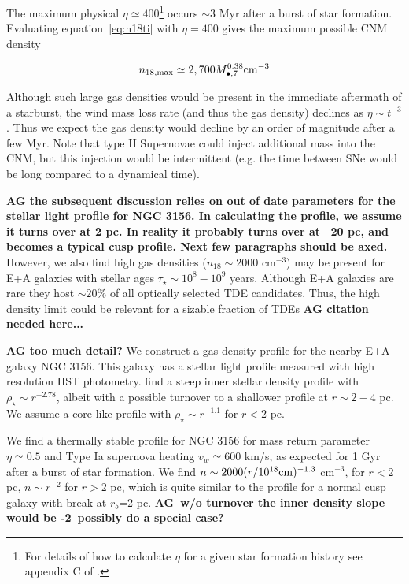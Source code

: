 \documentclass[usenatbib,fleqn]{mnras}
\newcommand{\Mbh}[1][]{M_{\bullet#1}}
\begin{document}
The maximum physical $\eta\simeq 400$\footnote{For details
  of how to calculate $\eta$ for a given star formation history see
  appendix C of \citet{Generozov+2015}.} occurs $\sim 3$ Myr after a
burst of star formation. Evaluating equation~\eqref{eq:n18ti} with
$\eta=400$ gives the maximum possible CNM density

\begin{equation}
n_{\rm 18,max} \simeq 2,700 \Mbh[,7]^{0.38} {\rm cm^{-3}}
\label{eq:n18max}
\end{equation}

Although such large gas densities would be present in the immediate
aftermath of a starburst, the wind mass loss rate (and thus the gas
density) declines as $\eta \sim t^{-3}$. Thus we expect the gas density would
decline by an order of magnitude after a few Myr. Note that type II
Supernovae could inject additional mass into the CNM, but this
injection would be intermittent (e.g. the time between SNe would be
long compared to a dynamical time).

{\bf AG the subsequent discussion relies on out of date parameters for
the stellar light profile for NGC 3156. In calculating the profile, we
assume it turns over at 2 pc. In reality it probably turns over at ~20
pc, and becomes a typical cusp profile. Next few paragraphs should be axed.}
However, we also find high gas densities ($n_{18}\sim 2000$ cm$^{-3}$)
may be present for E+A galaxies with stellar ages $\tau_\star\sim
10^8-10^9$ years. Although E+A galaxies are rare they host $\sim 20
\%$ of all optically selected TDE candidates. Thus, the high density
limit could be relevant for a sizable fraction of TDEs {\bf AG citation
  needed here...}

{\bf AG too much detail?} We construct a gas density profile for the
nearby E+A galaxy NGC 3156. This galaxy has a stellar light profile
measured with high resolution HST photometry. \citealt{Krajnovic+2013}
find a steep inner stellar density profile with $\rho_\star\sim
r^{-2.78}$, albeit with a possible turnover to a shallower profile at
$r \sim 2-4$ pc. We assume a core-like profile with $\rho_\star \sim
r^{-1.1}$ for $r<2$ pc.

We find a thermally stable profile for NGC 3156 for mass
return parameter $\eta\simeq0.5$ and Type Ia supernova heating
$v_w\simeq600 $ km/s, as expected for 1 Gyr after a burst of star
formation. We find $n \sim 2000 (r/10^{18} {\rm cm})^{-1.3}$
cm$^{-3}$, for $r<2$ pc, $n\sim r^{-2}$ for $r>2$ pc, which is quite
similar to the profile for a normal cusp galaxy with break at $r_b$=2
pc. {\bf AG--w/o turnover the inner density slope would be -2--possibly
do a special case?}
\end{document}
